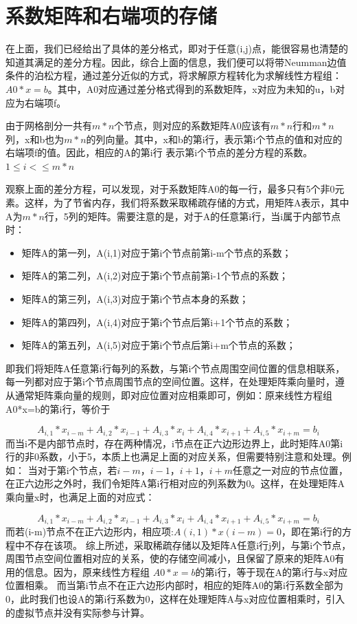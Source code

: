 \documentclass[a4paper,11pt]{ctexart} %
\begin{document}
\section{系数矩阵和右端项的存储}
在上面，我们已经给出了具体的差分格式，即对于任意(i,j)点，能很容易也清楚的知道其满足的差分方程。因此，综合上面的信息，我们便可以将带Neumman边值
条件的泊松方程，通过差分近似的方式，将求解原方程转化为求解线性方程组：$A0*x=b$。其中，A0对应通过差分格式得到的系数矩阵，x对应为未知的u，b对应为右端项f。\par
由于网格剖分一共有$m*n$个节点，则对应的系数矩阵A0应该有$m*n$行和$m*n$列，x和b也为$m*n$的列向量。其中，x和b的第i行，表示第i个节点的值和对应的右端项f的值。因此，相应的A的第i行
表示第i个节点的差分方程的系数。$1\leq i<\leq m*n$ \par
观察上面的差分方程，可以发现，对于系数矩阵A0的每一行，最多只有5个非0元素。这样，为了节省内存，我们将系数采取稀疏存储的方式，用矩阵A表示，其中A为$m*n$行，5列的矩阵。需要注意的是，对于A的任意第i行，当i属于内部节点时：\par
\begin{itemize}
\item 矩阵A的第一列，A(i,1)对应于第i个节点前第i-m个节点的系数；
\item 矩阵A的第二列，A(i,2)对应于第i个节点前第i-1个节点的系数；
\item 矩阵A的第三列，A(i,3)对应于第i个节点本身的系数；
\item 矩阵A的第四列，A(i,4)对应于第i个节点后第i+1个节点的系数；
\item 矩阵A的第五列，A(i,5)对应于第i个节点后第i+m个节点的系数；
\end{itemize}
即我们将矩阵A任意第i行每列的系数，与第i个节点周围空间位置的信息相联系，每一列都对应于第i个节点周围节点的空间位置。这样，在处理矩阵乘向量时，遵从通常矩阵乘向量的规则，即对应位置对应相乘即可，例如：原来线性方程组A0*x=b的第i行，等价于\par
\begin{equation*}
A_{i,1}*x_{i-m}+A_{i,2}*x_{i-1}+A_{i,3}*x_{i}+A_{i,4}*x_{i+1}+A_{i,5}*x_{i+m}=b_i
\end{equation*}
而当i不是内部节点时，存在两种情况，i节点在正六边形边界上，此时矩阵A0第i行的非0系数，小于5，本质上也满足上面的对应关系，但需要特别注意和处理。例如：
当对于第i个节点，若$i-m$，$i-1$，$i+1$，$i+m$任意之一对应的节点位置，在正六边形之外时，我们令矩阵A第i行相对应的列系数为0。这样，在处理矩阵A乘向量x时，也满足上面的对应式：\par
\begin{equation*}
A_{i,1}*x_{i-m}+A_{i,2}*x_{i-1}+A_{i,3}*x_{i}+A_{i,4}*x_{i+1}+A_{i,5}*x_{i+m}=b_i
\end{equation*}
而若(i-m)节点不在正六边形内，相应项:$A(i,1)*x(i-m)=0$，即在第i行的方程中不存在该项。
综上所述，采取稀疏存储以及矩阵A任意i行j列，与第i个节点，周围节点空间位置相对应的关系，使的存储空间减小，且保留了原来的矩阵A0有用的信息。因为，原来线性方程组
$A0*x=b$的第i行，等于现在A的第i行与x对应位置相乘。
而当第i节点不在正六边形内部时，相应的矩阵A0的第i行系数全部为0，此时我们也设A的第i行系数为0，这样在处理矩阵A与x对应位置相乘时，引入的虚拟节点并没有实际参与计算。\par
\end{document}
